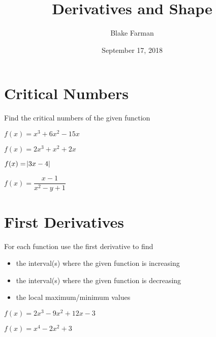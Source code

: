 \documentclass[10pt]{amsart}
\title{Derivatives and Shape}
\date{September 17, 2018}
\author{Blake Farman}
\begin{document}
\maketitle

\makenameslot
\section*{Critical Numbers}
\noindent
Find the critical numbers of the given function
\begin{multicols}{2}
  \begin{thm}
    \(f(x) = x^3 + 6x^2 - 15x\)
  \end{thm}
  
  \begin{thm}
    \(f(x) = 2x^3 + x^2 + 2x\)
  \end{thm}
\end{multicols}

\vspace{2in}

\begin{multicols}{2}
  \begin{thm}
    \(f(x) = \abs{3x - 4}\)
  \end{thm}

  \begin{thm}
    \(f(x) = \dfrac{x - 1}{x^2 - y + 1}\)
  \end{thm}
\end{multicols}

\newpage
\section*{First Derivatives}
\noindent
For each function use the first derivative to find
\begin{itemize}
\item
  the interval(s) where the given function is increasing
\item
  the interval(s) where the given function is decreasing
\item
  the local maximum/minimum values
\end{itemize}
\begin{multicols}{2}
  \begin{thm}
    \(f(x) = 2x^3 - 9x^2 + 12x - 3\)
  \end{thm}

  \begin{thm}
    \(f(x) = x^4 - 2x^2 + 3\)
  \end{thm}
\end{multicols}
\end{document}
